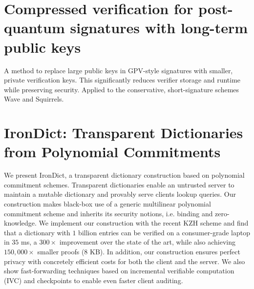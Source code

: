 \documentclass[11pt]{article}
\theoremstyle{definition}
\theoremstyle{remark}
\theoremstyle{plain}
\begin{document}
\section{\cite{cryptoeprint:2025/1576} Compressed verification for post-quantum signatures with long-term public keys}
A method to replace large public keys in GPV-style signatures with smaller, private verification keys. This significantly reduces verifier storage and runtime while preserving security. Applied to the conservative, short-signature schemes Wave and Squirrels.
\section{\cite{cryptoeprint:2025/1580} IronDict: Transparent Dictionaries from Polynomial Commitments}
We present IronDict, a transparent dictionary construction based on polynomial commitment schemes. Transparent dictionaries enable an untrusted server to maintain a mutable dictionary and provably serve clients lookup queries.  Our construction makes black-box use of a generic multilinear polynomial commitment scheme and inherits its security notions, i.e. binding and zero-knowledge. We implement our construction with the recent KZH scheme and find that a dictionary with $1$ billion entries can be verified on a consumer-grade laptop in $35$ ms, a $300\times$ improvement over the state of the art, while also achieving $150{,}000\times$ smaller proofs ($8$ KB). In addition, our construction ensures perfect privacy with concretely efficient costs for both the client and the server. We also show fast-forwarding techniques based on incremental verifiable computation (IVC) and checkpoints to enable even faster client auditing.
\end{document}
